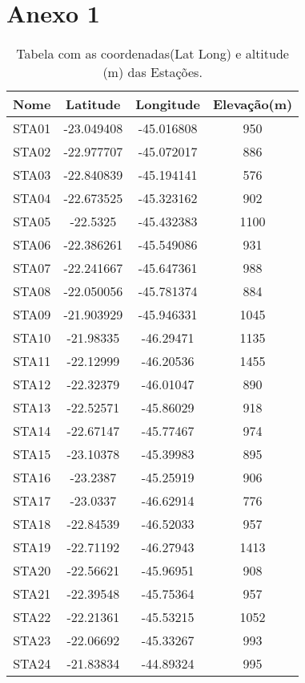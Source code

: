 \chapter*{Anexo 1}	


\begin{center}
\begin{table}[!ht]
\caption{Tabela com as coordenadas(Lat Long) e altitude (m) das Estações.}
\begin{center}
\begin{tabular}{| c | c | c | c |}
\toprule
{\large \textbf{Nome}} &	{\large \textbf{Latitude}} & {\large \textbf{Longitude}} & {\large \textbf{Elevação(m)}}\\
\bottomrule
STA01 & -23.049408 & -45.016808 & 950\\
STA02 & -22.977707 & -45.072017 & 886\\
STA03 & -22.840839 & -45.194141 & 576\\
STA04 & -22.673525 & -45.323162 & 902\\
STA05 & -22.5325 & -45.432383 & 1100\\
STA06 & -22.386261 & -45.549086 & 931\\
STA07 & -22.241667 & -45.647361 & 988\\
STA08 & -22.050056 & -45.781374 & 884\\
STA09 & -21.903929 & -45.946331 & 1045\\
STA10 & -21.98335 & -46.29471 & 1135\\
STA11 & -22.12999 & -46.20536 & 1455\\
STA12 & -22.32379 & -46.01047 & 890\\
STA13 & -22.52571 & -45.86029 & 918\\
STA14 & -22.67147 & -45.77467 & 974\\
STA15 & -23.10378 & -45.39983 & 895\\
STA16 & -23.2387 & -45.25919 & 906\\
STA17 & -23.0337 & -46.62914 & 776\\
STA18 & -22.84539 & -46.52033 & 957\\
STA19 & -22.71192 & -46.27943 & 1413\\
STA20 & -22.56621 & -45.96951 & 908\\
STA21 & -22.39548 & -45.75364 & 957\\
STA22 & -22.21361 & -45.53215 & 1052\\
STA23 & -22.06692 & -45.33267 & 993\\
STA24 & -21.83834 & -44.89324 & 995\\
\hline
\end{tabular}
\label{tabela1}
\end{center}
\end{table}
\end{center}
